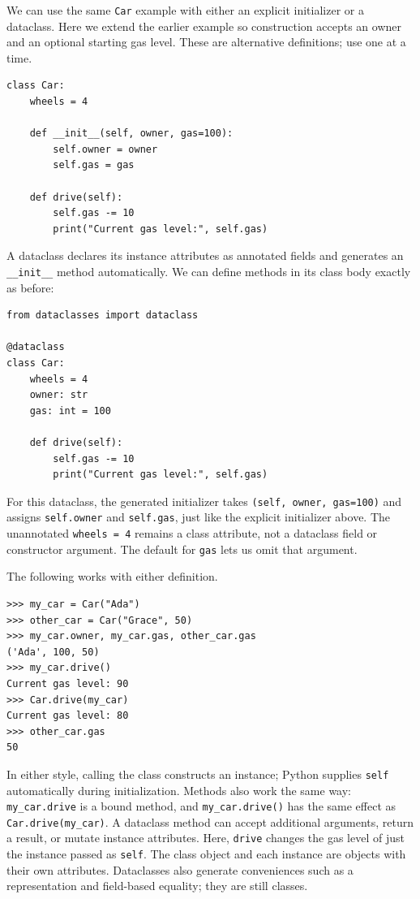 We can use the same \lstinline{Car} example with either an explicit initializer
or a dataclass. Here we extend the earlier example so construction accepts an
owner and an optional starting gas level. These are alternative definitions;
use one at a time.
\begin{lstlisting}
class Car:
    wheels = 4

    def __init__(self, owner, gas=100):
        self.owner = owner
        self.gas = gas

    def drive(self):
        self.gas -= 10
        print("Current gas level:", self.gas)
\end{lstlisting}

A dataclass declares its instance attributes as annotated fields and generates
an \lstinline{__init__} method automatically. We can define methods in its class
body exactly as before:
\begin{lstlisting}
from dataclasses import dataclass

@dataclass
class Car:
    wheels = 4
    owner: str
    gas: int = 100

    def drive(self):
        self.gas -= 10
        print("Current gas level:", self.gas)
\end{lstlisting}

For this dataclass, the generated initializer takes
\lstinline{(self, owner, gas=100)} and assigns \lstinline{self.owner} and
\lstinline{self.gas}, just like the explicit initializer above. The unannotated
\lstinline{wheels = 4} remains a class attribute, not a dataclass field or
constructor argument. The default for \lstinline{gas} lets us omit that argument.

The following works with either definition.
\begin{lstlisting}
>>> my_car = Car("Ada")
>>> other_car = Car("Grace", 50)
>>> my_car.owner, my_car.gas, other_car.gas
('Ada', 100, 50)
>>> my_car.drive()
Current gas level: 90
>>> Car.drive(my_car)
Current gas level: 80
>>> other_car.gas
50
\end{lstlisting}

In either style, calling the class constructs an instance; Python supplies
\lstinline{self} automatically during initialization. Methods also work the same
way: \lstinline{my_car.drive} is a bound method, and \lstinline{my_car.drive()}
has the same effect as \lstinline{Car.drive(my_car)}. A dataclass method can
accept additional arguments, return a result, or mutate instance attributes.
Here, \lstinline{drive} changes the gas level of just the instance passed as
\lstinline{self}. The class object and each instance are objects with their own
attributes. Dataclasses also generate conveniences such as a representation
and field-based equality; they are still classes.
